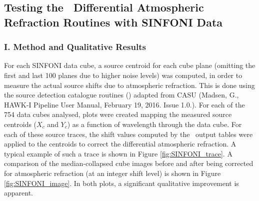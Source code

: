 \subsection{Testing the \hdrldar\ Differential Atmospheric Refraction Routines with SINFONI Data}

\subsubsection{I.  Method and Qualitative Results}

For each SINFONI data cube, a source centroid for each cube plane (omitting the first and last 100 planes due to higher noise levels) was computed, in order to measure
the actual source shifts due to atmospheric refraction.  This is done using the source detection catalogue routines (\hdrlcat) adapted from CASU (Madsen, G.,   
HAWK-I Pipeline User Manual, February 19, 2016.  Issue 1.0.).
For each of the 754 data cubes analysed, plots were created mapping the measured source centroids ($X_c$ and $Y_c$) as a function of wavelength through the data cube.    
For each of these source traces, the shift values computed by the \hdrldar\ output tables were applied to the centroids to correct the
differential atmospheric refraction.  A typical example of such a trace is shown in Figure \ref{fig:SINFONI_trace}.
A comparison of the median-collapsed cube images before and after being corrected for atmospheric refraction (at an integer shift level) is shown in Figure \ref{fig:SINFONI_image}.
In both plots, a significant qualitative improvement is apparent.


